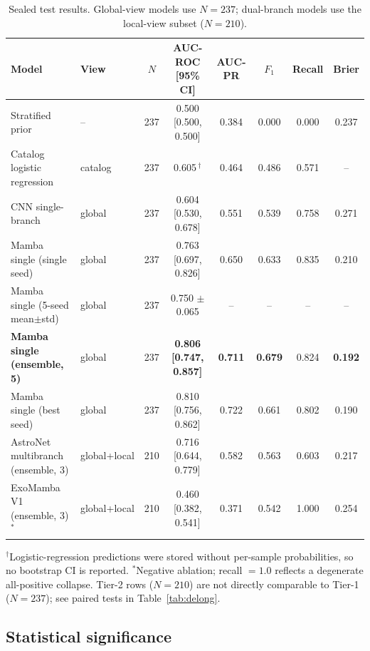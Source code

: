 \documentclass[conference]{IEEEtran}
\begin{document}
\begin{table}[!t]
\caption{Sealed test results. Global-view models use $N=237$; dual-branch models
use the local-view subset ($N=210$).}
\label{tab:main}
\centering
\footnotesize
\setlength{\tabcolsep}{6pt}
\begin{tabular}{llcccccc}
\toprule
Model & View & $N$ & AUC-ROC [95\% CI] & AUC-PR & $F_1$ & Recall & Brier \\
\midrule
Stratified prior            & --      & 237 & 0.500 [0.500, 0.500] & 0.384 & 0.000 & 0.000 & 0.237 \\
Catalog logistic regression & catalog & 237 & 0.605\,$^{\dagger}$   & 0.464 & 0.486 & 0.571 & --    \\
CNN single-branch           & global  & 237 & 0.604 [0.530, 0.678] & 0.551 & 0.539 & 0.758 & 0.271 \\
Mamba single (single seed)  & global  & 237 & 0.763 [0.697, 0.826] & 0.650 & 0.633 & 0.835 & 0.210 \\
Mamba single (5-seed mean$\pm$std) & global & 237 & 0.750 $\pm$ 0.065 & -- & -- & -- & -- \\
\textbf{Mamba single (ensemble, 5)} & global & 237 & \textbf{0.806 [0.747, 0.857]} & \textbf{0.711} & \textbf{0.679} & 0.824 & \textbf{0.192} \\
Mamba single (best seed)    & global  & 237 & 0.810 [0.756, 0.862] & 0.722 & 0.661 & 0.802 & 0.190 \\
\midrule
AstroNet multibranch (ensemble, 3) & global+local & 210 & 0.716 [0.644, 0.779] & 0.582 & 0.563 & 0.603 & 0.217 \\
ExoMamba V1 (ensemble, 3)\,$^{\ast}$ & global+local & 210 & 0.460 [0.382, 0.541] & 0.371 & 0.542 & 1.000 & 0.254 \\
\bottomrule
\end{tabular}

\vspace{2pt}
\begin{flushleft}\footnotesize
$^{\dagger}$Logistic-regression predictions were stored without per-sample
probabilities, so no bootstrap CI is reported. \quad
$^{\ast}$Negative ablation; recall $=1.0$ reflects a degenerate all-positive
collapse. Tier-2 rows ($N{=}210$) are not directly comparable to Tier-1
($N{=}237$); see paired tests in Table~\ref{tab:delong}.
\end{flushleft}
\end{table}

\subsection{Statistical significance}
\end{document}
